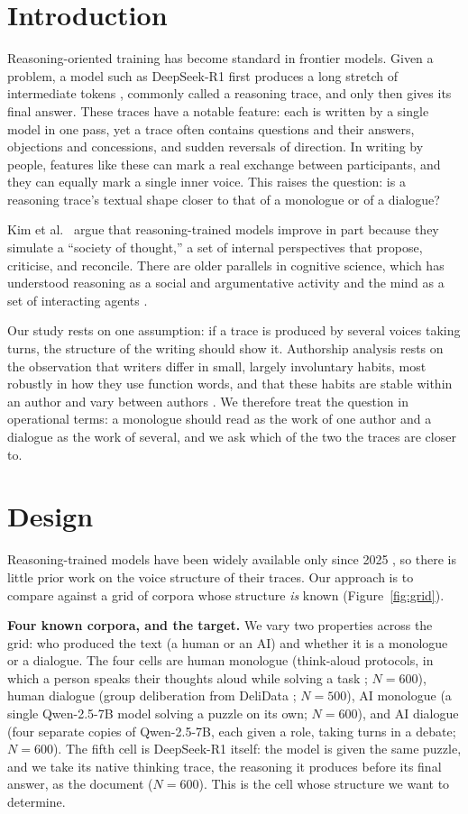 \documentclass[10pt,twocolumn]{article}
\begin{document}
\section{Introduction}
Reasoning-oriented training has become standard in frontier models. Given a problem, a model such as
DeepSeek-R1 \cite{guo2025} first produces a long stretch of intermediate tokens
\cite{kambhampati2025}, commonly called a reasoning trace, and only then gives its final answer.
These traces have a notable feature: each is written by a single model in one pass, yet a trace often
contains questions and their answers, objections and concessions, and sudden reversals of direction.
In writing by people, features like these can mark a real exchange between participants, and they can
equally mark a single inner voice. This raises the question: is a reasoning trace's textual shape
closer to that of a monologue or of a dialogue?

Kim et al.~\cite{kim2026} argue that reasoning-trained models improve in part because they simulate
a ``society of thought,'' a set of internal perspectives that propose, criticise, and reconcile.
There are older parallels in cognitive science, which has understood reasoning as a social and
argumentative activity \cite{mercier2017} and the mind as a set of interacting agents
\cite{minsky1986}.

Our study rests on one assumption: if a trace is produced by several voices taking turns, the
structure of the writing should show it. Authorship analysis rests on the observation that writers
differ in small, largely involuntary habits, most robustly in how they use function words, and that
these habits are stable within an author and vary between authors \cite{stamatatos2009}. We
therefore treat the question in operational terms: a monologue should read as the work of one author
and a dialogue as the work of several, and we ask which of the two the traces are closer to.

\section{Design}
Reasoning-trained models have been widely available only since 2025 \cite{guo2025}, so there is
little prior work on the voice structure of their traces. Our approach is to compare against a grid
of corpora whose structure \emph{is} known (Figure~\ref{fig:grid}).

\textbf{Four known corpora, and the target.} We vary two properties across the grid: who produced
the text (a human or an AI) and whether it is a monologue or a dialogue. The four cells are human
monologue (think-aloud protocols, in which a person speaks their thoughts aloud while solving a task
\cite{wurgaft2025}; $N=600$), human dialogue (group deliberation from DeliData \cite{karadzhov2023};
$N=500$), AI monologue (a single Qwen-2.5-7B model solving a puzzle on its own; $N=600$), and AI
dialogue (four separate copies of Qwen-2.5-7B, each given a role, taking turns in a debate;
$N=600$). The fifth cell is DeepSeek-R1 itself: the model is given the same puzzle, and we take its
native thinking trace, the reasoning it produces before its final answer, as the document ($N=600$).
This is the cell whose structure we want to determine.
\end{document}
